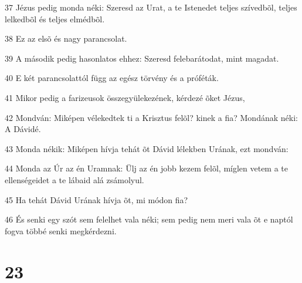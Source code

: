 \par 37 Jézus pedig monda néki: Szeresd az Urat, a te Istenedet teljes szívedbõl, teljes lelkedbõl és teljes elmédbõl.
\par 38 Ez az elsõ és nagy parancsolat.
\par 39 A második pedig hasonlatos ehhez: Szeresd felebarátodat, mint magadat.
\par 40 E két parancsolattól függ az egész törvény és a próféták.
\par 41 Mikor pedig a farizeusok összegyülekezének, kérdezé õket Jézus,
\par 42 Mondván: Miképen vélekedtek ti a Krisztus felõl? kinek a fia? Mondának néki: A Dávidé.
\par 43 Monda nékik: Miképen hívja tehát õt Dávid lélekben Urának, ezt mondván:
\par 44 Monda az Úr az én Uramnak: Ülj az én jobb kezem felõl, míglen vetem a te ellenségeidet a te lábaid alá zsámolyul.
\par 45 Ha tehát Dávid Urának hívja õt, mi módon fia?
\par 46 És senki egy szót sem felelhet vala néki; sem pedig nem meri vala õt e naptól fogva többé senki megkérdezni.

\chapter{23}

